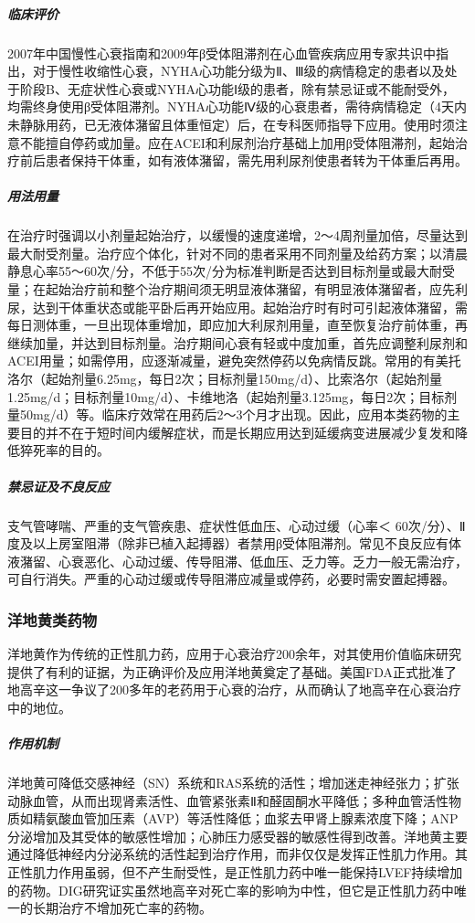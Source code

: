 \subparagraph{临床评价}

2007年中国慢性心衰指南和2009年β受体阻滞剂在心血管疾病应用专家共识中指出，对于慢性收缩性心衰，NYHA心功能分级为Ⅱ、Ⅲ级的病情稳定的患者以及处于阶段B、无症状性心衰或NYHA心功能Ⅰ级的患者，除有禁忌证或不能耐受外，均需终身使用β受体阻滞剂。NYHA心功能Ⅳ级的心衰患者，需待病情稳定（4天内未静脉用药，已无液体潴留且体重恒定）后，在专科医师指导下应用。使用时须注意不能擅自停药或加量。应在ACEI和利尿剂治疗基础上加用β受体阻滞剂，起始治疗前后患者保持干体重，如有液体潴留，需先用利尿剂使患者转为干体重后再用。

\subparagraph{用法用量}

在治疗时强调以小剂量起始治疗，以缓慢的速度递增，2～4周剂量加倍，尽量达到最大耐受剂量。治疗应个体化，针对不同的患者采用不同剂量及给药方案；以清晨静息心率55～60次/分，不低于55次/分为标准判断是否达到目标剂量或最大耐受量；在起始治疗前和整个治疗期间须无明显液体潴留，有明显液体潴留者，应先利尿，达到干体重状态或能平卧后再开始应用。起始治疗时有时可引起液体潴留，需每日测体重，一旦出现体重增加，即应加大利尿剂用量，直至恢复治疗前体重，再继续加量，并达到目标剂量。治疗期间心衰有轻或中度加重，首先应调整利尿剂和ACEI用量；如需停用，应逐渐减量，避免突然停药以免病情反跳。常用的有美托洛尔（起始剂量6.25mg，每日2次；目标剂量150mg/d）、比索洛尔（起始剂量1.25mg/d；目标剂量10mg/d）、卡维地洛（起始剂量3.125mg，每日2次；目标剂量50mg/d）等。临床疗效常在用药后2～3个月才出现。因此，应用本类药物的主要目的并不在于短时间内缓解症状，而是长期应用达到延缓病变进展减少复发和降低猝死率的目的。

\subparagraph{禁忌证及不良反应}

支气管哮喘、严重的支气管疾患、症状性低血压、心动过缓（心率＜
60次/分）、Ⅱ度及以上房室阻滞（除非已植入起搏器）者禁用β受体阻滞剂。常见不良反应有体液潴留、心衰恶化、心动过缓、传导阻滞、低血压、乏力等。乏力一般无需治疗，可自行消失。严重的心动过缓或传导阻滞应减量或停药，必要时需安置起搏器。

\subsubsection{洋地黄类药物}

洋地黄作为传统的正性肌力药，应用于心衰治疗200余年，对其使用价值临床研究提供了有利的证据，为正确评价及应用洋地黄奠定了基础。美国FDA正式批准了地高辛这一争议了200多年的老药用于心衰的治疗，从而确认了地高辛在心衰治疗中的地位。

\subparagraph{作用机制}

洋地黄可降低交感神经（SN）系统和RAS系统的活性；增加迷走神经张力；扩张动脉血管，从而出现肾素活性、血管紧张素Ⅱ和醛固酮水平降低；多种血管活性物质如精氨酸血管加压素（AVP）等活性降低；血浆去甲肾上腺素浓度下降；ANP分泌增加及其受体的敏感性增加；心肺压力感受器的敏感性得到改善。洋地黄主要通过降低神经内分泌系统的活性起到治疗作用，而非仅仅是发挥正性肌力作用。其正性肌力作用虽弱，但不产生耐受性，是正性肌力药中唯一能保持LVEF持续增加的药物。DIG研究证实虽然地高辛对死亡率的影响为中性，但它是正性肌力药中唯一的长期治疗不增加死亡率的药物。

